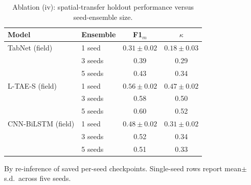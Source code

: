 \documentclass[journal]{IEEEtran}
\begin{document}
\begin{table}[!t]
\centering
\scriptsize
\caption{Ablation (iv): spatial-transfer holdout performance versus seed-ensemble size.}
\label{stab:ens}
\renewcommand{\arraystretch}{1.12}
\setlength{\tabcolsep}{8pt}
\begin{tabular}{llcc}
\toprule
\textbf{Model} & \textbf{Ensemble} & \textbf{F1$_m$} & \textbf{$\kappa$} \\
\midrule
TabNet (field)     & 1 seed  & $0.31\pm0.02$ & $0.18\pm0.03$ \\
                   & 3 seeds & 0.39 & 0.29 \\
                   & 5 seeds & 0.43 & 0.34 \\
\midrule
L-TAE-S (field)    & 1 seed  & $0.56\pm0.02$ & $0.47\pm0.02$ \\
                   & 3 seeds & 0.58 & 0.50 \\
                   & 5 seeds & 0.60 & 0.52 \\
\midrule
CNN-BiLSTM (field) & 1 seed  & $0.48\pm0.02$ & $0.31\pm0.02$ \\
                   & 3 seeds & 0.52 & 0.34 \\
                   & 5 seeds & 0.51 & 0.33 \\
\bottomrule
\end{tabular}
\par\vspace{3pt}
\begin{minipage}{\columnwidth}
\footnotesize
By re-inference of saved per-seed checkpoints. Single-seed rows report mean$\pm$s.d.\ across five seeds.
\end{minipage}
\end{table}
\end{document}

